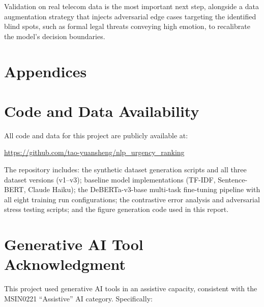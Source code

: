 \documentclass[11pt]{article}
\begin{document}
Validation on real telecom data is the most important next step, alongside a data
augmentation strategy that injects adversarial edge cases targeting the identified blind
spots, such as formal legal threats conveying high emotion, to recalibrate the model's
decision boundaries.

\newpage


\newpage
\appendix
\section*{Appendices}


\section{Code and Data Availability}

All code and data for this project are publicly available at:

\begin{center}
  \url{https://github.com/tao-yuansheng/nlp_urgency_ranking}
\end{center}

The repository includes: the synthetic dataset generation scripts and all three
dataset versions (v1--v3); baseline model implementations (TF-IDF, Sentence-BERT,
Claude Haiku); the DeBERTa-v3-base multi-task fine-tuning pipeline with all eight
training run configurations; the contrastive error analysis and adversarial stress
testing scripts; and the figure generation code used in this report.


\section{Generative AI Tool Acknowledgment}

This project used generative AI tools in an assistive capacity, consistent with
the MSIN0221 ``Assistive'' AI category. Specifically:
\end{document}
